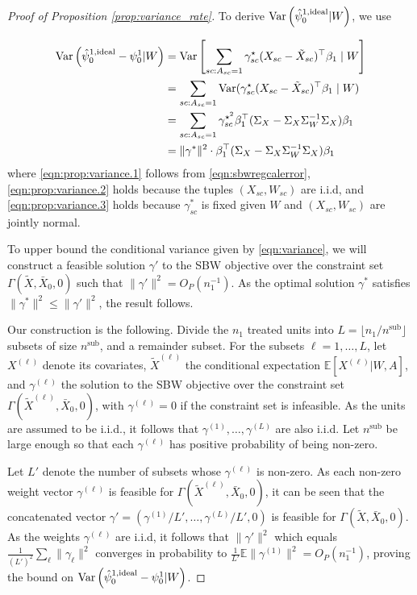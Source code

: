 \begin{proof}[Proof of Proposition \ref{prop:variance_rate}] 
To derive $\operatorname{Var}\left(\hat{\psi}_0^{1,\textup{ideal}} | W\right)$, we use

\begin{align}
\operatorname{Var}\left(\hat{\psi}_0^{1,\textup{ideal}} - \psi_0^1 | W\right) &= \operatorname{Var}\left[\sum_{sc: A_{sc} = 1}\gamma_{sc}^\star(X_{sc} - \tilde{X}_{sc})^\top\beta_1 \mid W\right] \label{eqn:prop:variance.1}\\
 &= \sum_{sc: A_{sc} = 1} \operatorname{Var}(\gamma_{sc}^\star(X_{sc} - \tilde{X}_{sc})^\top\beta_1 \mid W) \label{eqn:prop:variance.2}\\
 &= \sum_{sc: A_{sc} = 1} \gamma_{sc}^{\star^2}\beta_1^\top(\Sigma_{X} - \Sigma_{X}\Sigma_{W}^{-1}\Sigma_{X})\beta_1  \label{eqn:prop:variance.3}\\
& = \|\gamma^*\|^2 \cdot \beta_1^\top(\Sigma_{X} - \Sigma_{X}\Sigma_{W}^{-1}\Sigma_{X})\beta_1 \label{eqn:variance}
\end{align}
%
where \eqref{eqn:prop:variance.1} follows from \eqref{eqn:sbwregcalerror}, \eqref{eqn:prop:variance.2} holds because the tuples $(X_{sc}, W_{sc})$ are i.i.d, and \eqref{eqn:prop:variance.3} holds because $\gamma_{sc}^*$ is fixed given $W$ and $(X_{sc}, W_{sc})$ are jointly normal. 

To upper bound the conditional variance given by \eqref{eqn:variance}, we will construct a feasible solution $\gamma'$ to the SBW objective over the constraint set $\Gamma(\tilde{X}, \bar{X}_0, 0)$ such that $\|\gamma'\|^2 = O_P(n_1^{-1})$. As the optimal solution $\gamma^*$ satisfies $\|\gamma^*\|^2 \leq \|\gamma'\|^2$, the result follows.

Our construction is the following. Divide the $n_1$ treated units into $L = \lfloor n_1/n^{\text{sub}} \rfloor$ subsets of size $n^{\text{sub}}$, and a remainder subset. For the subsets $\ell=1,\ldots,L$, let $X^{(\ell)}$ denote its covariates, $\tilde{X}^{(\ell)}$ the conditional expectation $\mathbb{E}[X^{(\ell)}|W, A]$, and  $\gamma^{(\ell)}$ the solution to the SBW objective over the constraint set $\Gamma(\tilde{X}^{(\ell)}, \bar{X}_0, 0)$, with $\gamma^{(\ell)}=0$ if the constraint set is infeasible. As the units are assumed to be i.i.d., it follows that $\gamma^{(1)}, \ldots, \gamma^{(L)}$ are also i.i.d. Let $n^{\text{sub}}$ be large enough so that each $\gamma^{(\ell)}$ has positive probability of being non-zero. 

Let $L'$ denote the number of subsets whose $\gamma^{(\ell)}$ is non-zero. As each non-zero weight vector $\gamma^{(\ell)}$ is feasible for $\Gamma(\tilde{X}^{(\ell)}, \bar{X}_0, 0)$, it can be seen that the concatenated vector $\gamma' = (\gamma^{(1)}/L', \ldots, \gamma^{(L)}/L', 0)$ is feasible for $\Gamma(\tilde{X},\bar{X}_0,0)$. As the weights $\gamma^{(\ell)}$ are i.i.d, it follows that $\| \gamma'\|^2$ which equals $\frac{1}{(L')^2} \sum_\ell \|\gamma_\ell\|^2$  converges in probability to $\frac{1}{L'} \mathbb{E}\|\gamma^{(1)}\|^2 = O_P(n_1^{-1})$, proving the bound on $\operatorname{Var}\left(\hat{\psi}_0^{1,\textup{ideal}} - \psi_0^1 | W\right)$.


\end{proof}
